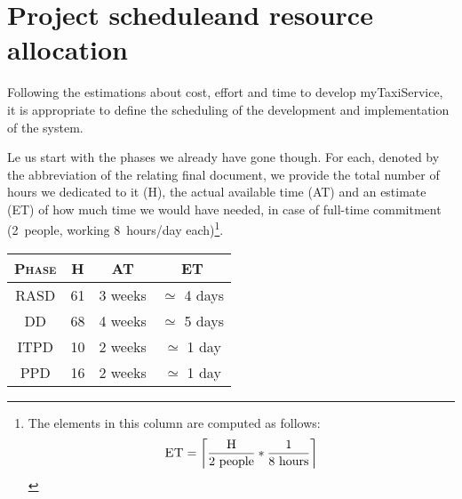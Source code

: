 \chapter[Project schedule and resource allocation]{Project schedule\newline{}and resource allocation}\label{chap:allocation}




Following the estimations about cost, effort and time to develop myTaxiService, it is appropriate to define the scheduling of the development and implementation of the system. 

Le us start with the phases we already have gone though. For each, denoted by the abbreviation of the relating final document, we provide the total number of hours we dedicated to it (\textsc{H}), the actual available time (\textsc{AT}) and an estimate (\textsc{ET}) of how much time we would have needed, in case of full-time commitment (2~people, working 8~hours/day each)\footnote{The elements in this column are computed as follows:{\setlength{\mathindent}{.5cm} \begin{equation*}
	\text{\textsc{ET}} = \left\lceil \frac{\text{\textsc{H}}}{2 \text{ people}} * \frac{1}{8 \text{ hours}} \right\rceil
\end{equation*}}}. 

\begin{table}\centering\begin{tabular}{ >{\ttfamily}c c c c }

\toprule
\normalfont\textsc{Phase} & \normalfont\textsc{H} & \normalfont\textsc{AT} & \normalfont\textsc{ET} \\
\toprule

RASD & 		61 &	3 weeks & 	$\simeq$ 4 days \\\midrule
DD &		68 &	4 weeks & 	$\simeq$ 5 days \\\midrule
ITPD &		10 &	2 weeks &	$\simeq$ 1 day  \\\midrule
PPD &		16 &	2 weeks & 	$\simeq$ 1 day  \\

\bottomrule
	
\end{tabular}
\vspace{\baselineskip}
\end{table}


